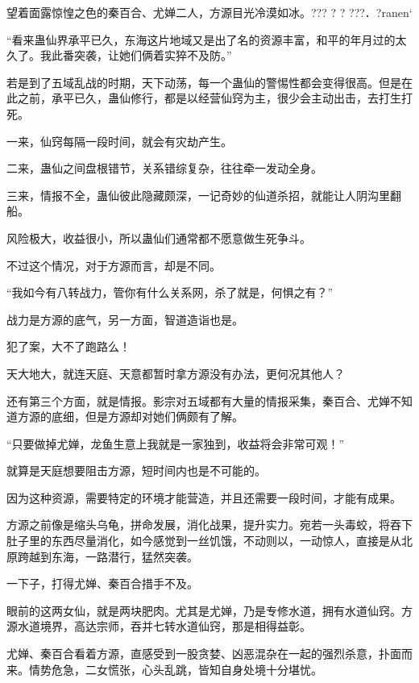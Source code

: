 
\begin{this_body}

望着面露惊惶之色的秦百合、尤婵二人，方源目光冷漠如冰。??? ? ?  ???．?ranen`

“看来蛊仙界承平已久，东海这片地域又是出了名的资源丰富，和平的年月过的太久了。我此番突袭，让她们俩着实猝不及防。”

若是到了五域乱战的时期，天下动荡，每一个蛊仙的警惕性都会变得很高。但是在此之前，承平已久，蛊仙修行，都是以经营仙窍为主，很少会主动出击，去打生打死。

一来，仙窍每隔一段时间，就会有灾劫产生。

二来，蛊仙之间盘根错节，关系错综复杂，往往牵一发动全身。

三来，情报不全，蛊仙彼此隐藏颇深，一记奇妙的仙道杀招，就能让人阴沟里翻船。

风险极大，收益很小，所以蛊仙们通常都不愿意做生死争斗。

不过这个情况，对于方源而言，却是不同。

“我如今有八转战力，管你有什么关系网，杀了就是，何惧之有？”

战力是方源的底气，另一方面，智道造诣也是。

犯了案，大不了跑路么！

天大地大，就连天庭、天意都暂时拿方源没有办法，更何况其他人？

还有第三个方面，就是情报。影宗对五域都有大量的情报采集，秦百合、尤婵不知道方源的底细，但是方源却对她们俩颇有了解。

“只要做掉尤婵，龙鱼生意上我就是一家独到，收益将会非常可观！”

就算是天庭想要阻击方源，短时间内也是不可能的。

因为这种资源，需要特定的环境才能营造，并且还需要一段时间，才能有成果。

方源之前像是缩头乌龟，拼命发展，消化战果，提升实力。宛若一头毒蛟，将吞下肚子里的东西尽量消化，如今感觉到一丝饥饿，不动则以，一动惊人，直接是从北原跨越到东海，一路潜行，猛然突袭。

一下子，打得尤婵、秦百合措手不及。

眼前的这两女仙，就是两块肥肉。尤其是尤婵，乃是专修水道，拥有水道仙窍。方源水道境界，高达宗师，吞并七转水道仙窍，那是相得益彰。

尤婵、秦百合看着方源，直感受到一股贪婪、凶恶混杂在一起的强烈杀意，扑面而来。情势危急，二女慌张，心头乱跳，皆知自身处境十分堪忧。


\end{this_body}
